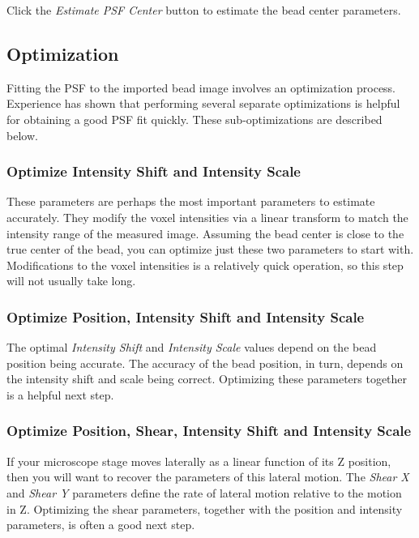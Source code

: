 \documentclass[11pt,titlepage,twoside]{article}
\begin{document}
Click the \emph{Estimate PSF Center} button to estimate the bead center parameters.

\subsection{Optimization}

Fitting the PSF to the imported bead image involves an optimization process. Experience has shown that performing several separate optimizations is helpful for obtaining a good PSF fit quickly. These sub-optimizations are described below.

\subsubsection{Optimize Intensity Shift and Intensity Scale}

These parameters are perhaps the most important parameters to estimate accurately. They modify the voxel intensities via a linear transform to match the intensity range of the measured image. Assuming the bead center is close to the true center of the bead, you can optimize just these two parameters to start with. Modifications to the voxel intensities is a relatively quick operation, so this step will not usually take long.

\subsubsection{Optimize Position, Intensity Shift and Intensity Scale}

The optimal \emph{Intensity Shift} and \emph{Intensity Scale} values depend on the bead position being accurate. The accuracy of the bead position, in turn, depends on the intensity shift and scale being correct. Optimizing these parameters together is a helpful next step.

\subsubsection{Optimize Position, Shear, Intensity Shift and Intensity Scale}

If your microscope stage moves laterally as a linear function of its Z position, then you will want to recover the parameters of this lateral motion. The \emph{Shear X} and \emph{Shear Y} parameters define the rate of lateral motion relative to the motion in Z. Optimizing the shear parameters, together with the position and intensity parameters, is often a good next step.
\end{document}
